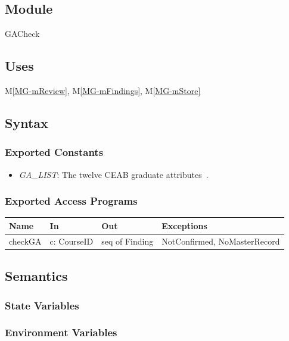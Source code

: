 \documentclass[12pt, titlepage]{article}
\newcommand{\mref}[1]{M\ref{MG-#1}}
\begin{document}
\subsection{Module}
GACheck

\subsection{Uses}
\mref{mReview}, \mref{mFindings}, \mref{mStore}

\subsection{Syntax}

\subsubsection{Exported Constants}
\begin{itemize}
\item \textit{GA\_LIST}: The twelve CEAB graduate attributes~\citep{CEAB2025}.
\end{itemize}

\subsubsection{Exported Access Programs}
\begin{center}\small
\begin{tabular}{>{\raggedright\arraybackslash}p{3.3cm} >{\raggedright\arraybackslash}p{4.1cm} >{\raggedright\arraybackslash}p{3.4cm} >{\raggedright\arraybackslash}p{4.0cm}}
\hline
\textbf{Name} & \textbf{In} & \textbf{Out} & \textbf{Exceptions} \\
\hline
checkGA & c: CourseID & seq of Finding & NotConfirmed, NoMasterRecord \\
\hline
\end{tabular}
\end{center}

\subsection{Semantics}

\subsubsection{State Variables}


\subsubsection{Environment Variables}
\end{document}
